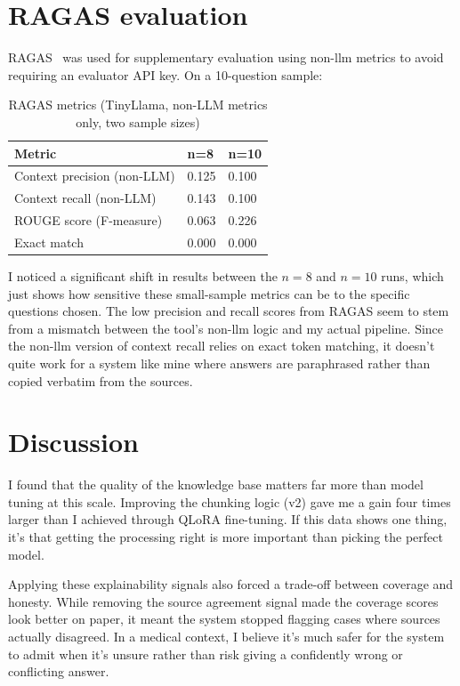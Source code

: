 \section{RAGAS evaluation}

RAGAS~\cite{es2023ragas} was used for supplementary evaluation using non-\ac{llm} metrics to avoid requiring an evaluator API key. On a 10-question sample:

\begin{table}[htbp]
\centering
\caption{RAGAS metrics (TinyLlama, non-LLM metrics only, two sample sizes)}
\renewcommand{\arraystretch}{1.3}
\begin{tabular}{|l|l|l|}
\hline
\textbf{Metric} & \textbf{n=8} & \textbf{n=10} \\
\hline
Context precision (non-LLM) & 0.125 & 0.100 \\
Context recall (non-LLM) & 0.143 & 0.100 \\
ROUGE score (F-measure) & 0.063 & 0.226 \\
Exact match & 0.000 & 0.000 \\
\hline
\end{tabular}
\end{table}

I noticed a significant shift in results between the $n=8$ and $n=10$ runs, which just shows how sensitive these small-sample metrics can be to the specific questions chosen. The low precision and recall scores from RAGAS seem to stem from a mismatch between the tool's non-\ac{llm} logic and my actual pipeline. Since the non-\ac{llm} version of context recall relies on exact token matching, it doesn't quite work for a system like mine where answers are paraphrased rather than copied verbatim from the sources.

\section{Discussion}

I found that the quality of the knowledge base matters far more than model tuning at this scale. Improving the chunking logic (v2) gave me a gain four times larger than I achieved through QLoRA fine-tuning. If this data shows one thing, it's that getting the processing right is more important than picking the perfect model.

Applying these explainability signals also forced a trade-off between coverage and honesty. While removing the source agreement signal made the coverage scores look better on paper, it meant the system stopped flagging cases where sources actually disagreed. In a medical context, I believe it's much safer for the system to admit when it's unsure rather than risk giving a confidently wrong or conflicting answer.

